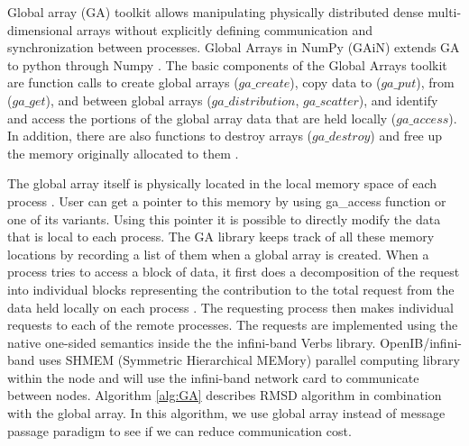 Global array (GA) toolkit allows manipulating physically distributed dense multi-dimensional arrays without explicitly defining communication and synchronization between processes.
Global Arrays in NumPy (GAiN) extends GA to python through Numpy \cite{GAiN}. 
The basic components of the Global Arrays toolkit are function calls to create global arrays ($ga\_create$), copy data to ($ga\_put$), from ($ga\_get$), and between global arrays ($ga\_distribution$, $ga\_scatter$), and identify and access the portions of the global array data that are held locally ($ga\_access$). 
In addition, there are also functions to destroy arrays ($ga\_destroy$) and free up the memory originally allocated to them \cite{GAiN}.

The global array itself is physically located in the local memory space of each process \cite{GA}. 
User can get a pointer to this memory by using ga\_access function or one of its variants.
Using this pointer it is possible to directly modify the data that is local to each process.
The GA library keeps track of all these memory locations by recording a list of them when a global array is created. 
When a process tries to access a block of data, it first does a decomposition of the request into individual blocks representing the contribution to the total request from the data held locally on each process \cite{PNNL:2018}. 
The requesting process then makes individual requests to each of the remote processes. 
The requests are implemented using the native one-sided semantics inside the the infini-band Verbs library. 
OpenIB/infini-band uses SHMEM (Symmetric Hierarchical MEMory) parallel computing library \cite{SHMEM1,SHMEM2} within the node and will use the infini-band network card to communicate between nodes.
Algorithm \ref{alg:GA} describes RMSD algorithm in combination with the global array.
In this algorithm, we use global array instead of message passage paradigm to see if we can reduce communication cost. 

